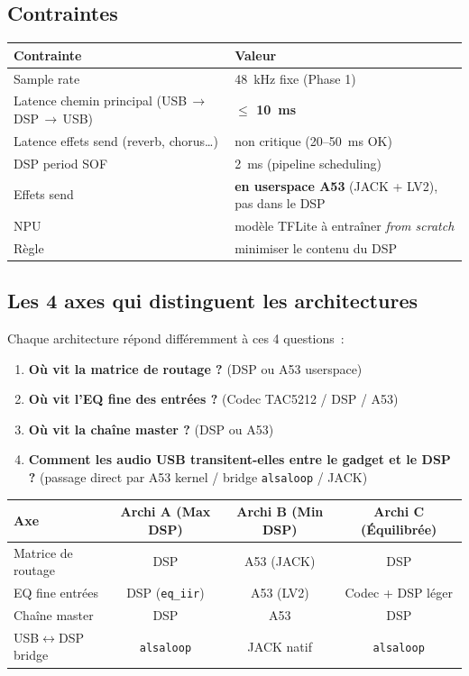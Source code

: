 \documentclass[11pt,a4paper]{article}
\begin{document}
\subsection{Contraintes}
\begin{center}
\begin{tabularx}{0.92\textwidth}{lX}
\toprule
\textbf{Contrainte} & \textbf{Valeur} \\
\midrule
Sample rate & 48~kHz fixe (Phase 1) \\
Latence chemin principal (USB\,$\rightarrow$\,DSP\,$\rightarrow$\,USB) & \textbf{$\leq$ 10~ms} \\
Latence effets send (reverb, chorus\ldots) & non critique (20--50~ms OK) \\
DSP period SOF & 2~ms (pipeline scheduling) \\
Effets send & \textbf{en userspace A53} (JACK + LV2), pas dans le DSP \\
NPU & modèle TFLite à entraîner \emph{from scratch} \\
Règle & minimiser le contenu du DSP \\
\bottomrule
\end{tabularx}
\end{center}

\subsection{Les 4 axes qui distinguent les architectures}
\label{sec:axes}

Chaque architecture répond différemment à ces 4 questions~:

\begin{enumerate}[leftmargin=*, itemsep=3pt]
  \item \textbf{Où vit la matrice de routage ?} (DSP ou A53 userspace)
  \item \textbf{Où vit l'EQ fine des entrées ?} (Codec TAC5212 / DSP / A53)
  \item \textbf{Où vit la chaîne master ?} (DSP ou A53)
  \item \textbf{Comment les audio USB transitent-elles entre le gadget et le DSP ?} (passage direct par A53 kernel / bridge \texttt{alsaloop} / JACK)
\end{enumerate}

\begin{center}
\begin{tabular}{lccc}
\toprule
\textbf{Axe} & \textbf{Archi A (Max DSP)} & \textbf{Archi B (Min DSP)} & \textbf{Archi C (Équilibrée)} \\
\midrule
Matrice de routage & DSP & A53 (JACK) & DSP \\
EQ fine entrées & DSP (\texttt{eq\_iir}) & A53 (LV2) & Codec + DSP léger \\
Chaîne master & DSP & A53 & DSP \\
USB$\leftrightarrow$DSP bridge & \texttt{alsaloop} & JACK natif & \texttt{alsaloop} \\
\bottomrule
\end{tabular}
\end{center}
\end{document}
